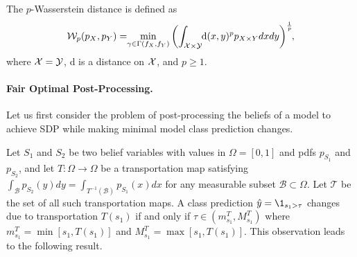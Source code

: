 \documentclass[letterpaper]{article}
\theoremstyle{definition}
\begin{document}
The $p$-Wasserstein distance is defined as
\[
\mathcal{W}_p(p_X, p_Y) = \hskip-0.1cm\min_{\gamma\in\Gamma(f_X, f_Y)} \left(\int_{{\cal X}\times {\cal Y}} \hskip-0.1cm\textrm{d}(x,y)^p p_{X\times Y}dxdy\right)^{\frac{1}{p}}\hskip-0.1cm,
\]
where ${\cal X}= {\cal Y}$, d is a distance on ${\cal X}$, and $p\geq 1$. %

\paragraph{Fair Optimal Post-Processing.}
Let us first consider the problem of post-processing the beliefs of a model to achieve SDP while making minimal model class prediction changes.

Let $S_1$ and $S_2$ be two belief variables with values in $\Omega=[0,1]$ and pdfs $p_{S_1}$ and $p_{S_2}$, and let $T: \Omega \rightarrow \Omega$ be a transportation map satisfying $\int_{\mathcal{B}}p_{S_2}(y)dy = \int_{T^{-1}(\mathcal{B})}p_{S_1}(x)dx$ for any measurable subset $\mathcal{B}\subset {\Omega}$. Let $\mathcal{T}$ be the set of all such transportation maps. A class prediction $\hat y=\1_{s_1>\tau}$ changes due to transportation $T(s_1)$ if and only if $\tau\in(m_{s_1}^T, M_{s_1}^T)$ where $m_{s_1}^T = \min[s_1, T(s_1)]$ and $M_{s_1}^T = \max [s_1, T(s_1)]$. This observation leads to the following result.
\end{document}
